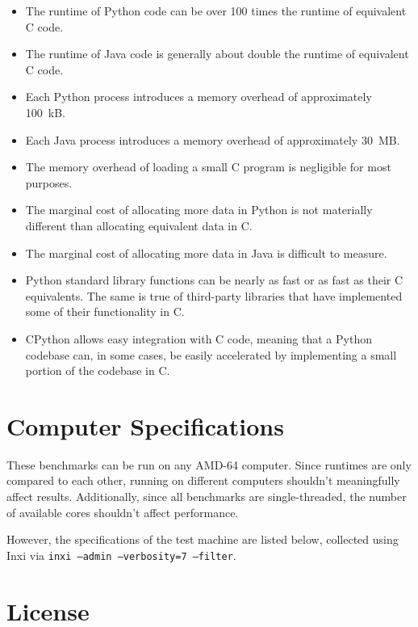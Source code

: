 \documentclass[12pt,letterpaper]{article}
\begin{document}
\begin{itemize}
  \item The runtime of Python code can be over 100 times the runtime of
    equivalent C code.
  \item The runtime of Java code is generally about double the runtime of
    equivalent C code.
  \item Each Python process introduces a memory overhead of approximately
    \SI{100}{\kilo B}.
  \item Each Java process introduces a memory overhead of approximately
    \SI{30}{\mega B}.
  \item The memory overhead of loading a small C program is negligible for
    most purposes.
  \item The marginal cost of allocating more data in Python is not materially
    different than allocating equivalent data in C.
  \item The marginal cost of allocating more data in Java is difficult to
    measure.
  \item Python standard library functions can be nearly as fast or as fast as
    their C equivalents. The same is true of third-party libraries that have
    implemented some of their functionality in C.
  \item CPython allows easy integration with C code, meaning that a Python
    codebase can, in some cases, be easily accelerated by implementing a small
    portion of the codebase in C.
\end{itemize}

\appendix

\section{Computer Specifications}

These benchmarks can be run on any AMD-64 computer. Since runtimes are only
compared to each other, running on different computers shouldn't meaningfully
affect results. Additionally, since all benchmarks are single-threaded, the
number of available cores shouldn't affect performance.

However, the specifications of the test machine are listed below, collected
using Inxi via \texttt{inxi --admin --verbosity=7 --filter}.



\section{License}\label{license}


\end{document}
